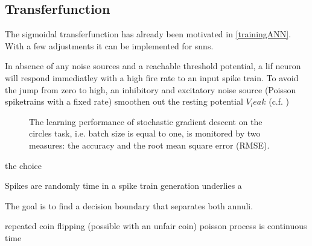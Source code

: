 \subsection{Transferfunction}

The sigmoidal transferfunction has already been motivated in \cref{trainingANN}. With a few adjustments it can be implemented for \glspl{snn}.

In absence of any noise sources and a reachable threshold potential, a \gls{lif} neuron will respond immediatley with a high fire rate to an input spike train. To avoid the jump from zero to high, an inhibitory and excitatory noise source (Poisson spiketrains with a fixed rate) smoothen out the resting potential $V_leak$ (c.f. )


\begin{figure}
	\label{vleak_w_noise}
	\begin{center}
		
	\end{center}
	\caption{The learning performance of stochastic gradient descent on the circles task, i.e. batch size is equal to one, is monitored by two measures: the accuracy and the root mean square error (RMSE).}
\end{figure}


 the choice




Spikes are randomly time in a spike train generation underlies a 




%
%


The goal is to find a decision boundary that separates both annuli. 

repeated coin flipping (possible with an unfair coin) poisson process is continuous time 

